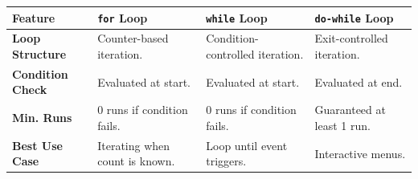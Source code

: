\documentclass[12pt,a4paper]{article}
\renewcommand{\arraystretch}{1.45}
\begin{document}
\begin{tcolorbox}[tikzbox, title={Java Iteration Statement Comparisons}]
\centering
{\renewcommand{\arraystretch}{1.45}%
\begin{tabularx}{\linewidth}{|B{2.8cm}|Y|Y|Y|}
\hline
\textbf{Feature} & \textbf{\texttt{for} Loop} & \textbf{\texttt{while} Loop} & \textbf{\texttt{do-while} Loop} \\
\hline
\textbf{Loop Structure} & Counter-based iteration. & Condition-controlled iteration. & Exit-controlled iteration. \\
\hline
\textbf{Condition Check} & Evaluated at start. & Evaluated at start. & Evaluated at end. \\
\hline
\textbf{Min. Runs} & 0 runs if condition fails. & 0 runs if condition fails. & Guaranteed at least 1 run. \\
\hline
\textbf{Best Use Case} & Iterating when count is known. & Loop until event triggers. & Interactive menus. \\
\hline
\end{tabularx}}
\end{tcolorbox}
\end{document}
